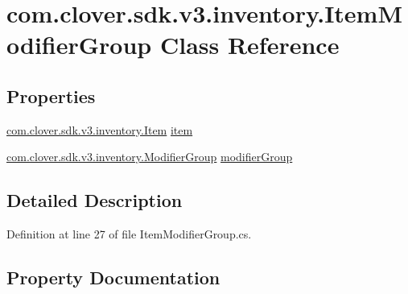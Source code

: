 \hypertarget{classcom_1_1clover_1_1sdk_1_1v3_1_1inventory_1_1_item_modifier_group}{}\section{com.\+clover.\+sdk.\+v3.\+inventory.\+Item\+Modifier\+Group Class Reference}
\label{classcom_1_1clover_1_1sdk_1_1v3_1_1inventory_1_1_item_modifier_group}
\subsection*{Properties}
\begin{DoxyCompactItemize}
\item 
\hyperlink{classcom_1_1clover_1_1sdk_1_1v3_1_1inventory_1_1_item}{com.\+clover.\+sdk.\+v3.\+inventory.\+Item} \hyperlink{classcom_1_1clover_1_1sdk_1_1v3_1_1inventory_1_1_item_modifier_group_ab39fde18f42d9ed724d20bff2261adbb}{item}
\item 
\hyperlink{classcom_1_1clover_1_1sdk_1_1v3_1_1inventory_1_1_modifier_group}{com.\+clover.\+sdk.\+v3.\+inventory.\+Modifier\+Group} \hyperlink{classcom_1_1clover_1_1sdk_1_1v3_1_1inventory_1_1_item_modifier_group_a0f5080c613ec235d5374f51666563130}{modifier\+Group}
\end{DoxyCompactItemize}


\subsection{Detailed Description}


Definition at line 27 of file Item\+Modifier\+Group.\+cs.



\subsection{Property Documentation}
\mbox{\label{classcom_1_1clover_1_1sdk_1_1v3_1_1inventory_1_1_item_modifier_group_ab39fde18f42d9ed724d20bff2261adbb}} 
